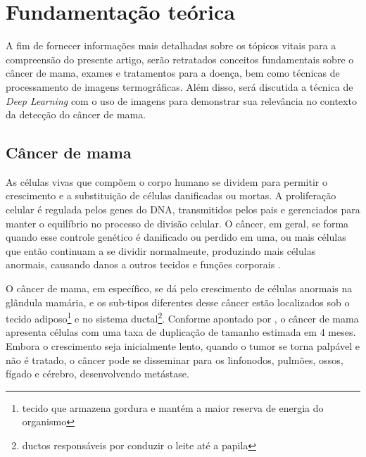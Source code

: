 \section{\esp Fundamentação teórica} 

A fim de fornecer informações mais detalhadas sobre os tópicos vitais para a compreensão do presente artigo, serão retratados conceitos fundamentais sobre o câncer de mama, exames e tratamentos para a doença, bem como técnicas de processamento de imagens termográficas. Além disso, será discutida a técnica de \textit{Deep Learning} com o uso de imagens para demonstrar sua relevância no contexto da detecção do câncer de mama.




\subsection{\esp Câncer de mama}
As células vivas que compõem o corpo humano se dividem para permitir o crescimento e a substituição de células danificadas ou mortas. A proliferação celular é regulada pelos genes do DNA, transmitidos pelos pais e gerenciados para manter o equilíbrio no processo de divisão celular. O câncer, em geral, se forma quando esse controle genético é danificado ou perdido em uma, ou mais células que então continuam a se dividir normalmente, produzindo mais células anormais, causando danos a outros tecidos e funções corporais \cite{basicOncology}.

O câncer de mama, em específico, se dá pelo crescimento de células anormais na glândula mamária, e os sub-tipos diferentes desse câncer estão localizados sob o tecido adiposo\footnote{tecido que armazena gordura e mantém a maior reserva de energia do organismo} e no sistema ductal\footnote{ductos responsáveis por conduzir o leite até a papila}. Conforme apontado por , o câncer de mama apresenta células com uma taxa de duplicação de tamanho estimada em 4 meses. Embora o crescimento seja inicialmente lento, quando o tumor se torna palpável e não é tratado, o câncer pode se disseminar para os linfonodos, pulmões, ossos, fígado e cérebro, desenvolvendo metástase.

